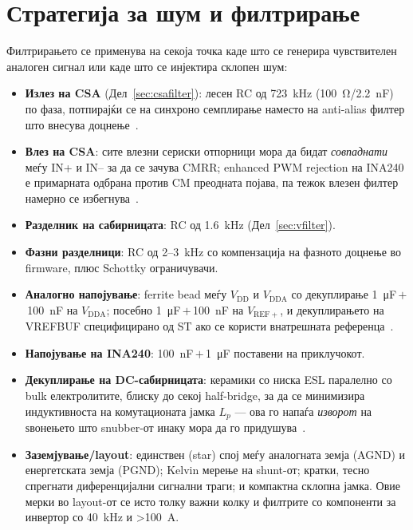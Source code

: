 \documentclass[journal,onecolumn,11pt]{IEEEtran}
\begin{document}
\section{Стратегија за шум и филтрирање}\label{sec:noise}
Филтрирањето се применува на секоја точка каде што се генерира чувствителен аналоген
сигнал или каде што се инјектира склопен шум:
\begin{itemize}[leftmargin=1.3em]
\item \textbf{Излез на CSA} (Дел~\ref{sec:csafilter}): лесен RC од \SI{723}{\kilo\hertz}
      (\SI{100}{\ohm}/\SI{2.2}{\nano\farad}) по фаза, потпирајќи се на синхроно
      семплирање наместо на anti-alias филтер што внесува доцнење~\cite{an5346}.
\item \textbf{Влез на CSA}: сите влезни сериски отпорници мора да бидат \emph{совпаднати}
      меѓу IN+ и IN-- за да се зачува CMRR; enhanced PWM rejection на INA240 е
      примарната одбрана против CM преодната појава, па тежок влезен филтер намерно се
      избегнува~\cite{ina240ds}.
\item \textbf{Разделник на сабирницата}: RC од \SI{1.6}{\kilo\hertz} (Дел~\ref{sec:vfilter}).
\item \textbf{Фазни разделници}: RC од 2--\SI{3}{\kilo\hertz} со компензација на
      фазното доцнење во firmware, плюс Schottky ограничувачи.
\item \textbf{Аналогно напојување}: ferrite bead меѓу $V_{\mathrm{DD}}$ и
      $V_{\mathrm{DDA}}$ со декуплирање \SI{1}{\micro\farad}\,$+$\,\SI{100}{\nano\farad}
      на $V_{\mathrm{DDA}}$; посебно \SI{1}{\micro\farad}\,$+$\,\SI{100}{\nano\farad} на
      $V_{\mathrm{REF+}}$, и декуплирањето на VREFBUF специфицирано од ST ако се
      користи внатрешната референца~\cite{stm32g473ds}.
\item \textbf{Напојување на INA240}: \SI{100}{\nano\farad}\,$+$\,\SI{1}{\micro\farad}
      поставени на приклучокот.
\item \textbf{Декуплирање на DC-сабирницата}: керамики со ниска ESL паралелно со bulk
      електролитите, блиску до секој half-bridge, за да се минимизира индуктивноста на
      комутационата јамка $L_p$ --- ова го напаѓа \emph{изворот} на ѕвонењето што
      snubber-от инаку мора да го придушува~\cite{severns}.
\item \textbf{Заземјување/layout}: единствен (star) спој меѓу аналогната земја (AGND)
      и енергетската земја (PGND); Kelvin мерење на shunt-от; кратки, тесно спрегнати
      диференцијални сигнални траги; и компактна склопна јамка. Овие мерки во layout-от
      се исто толку важни колку и филтрите со компоненти за инвертор со
      \SI{40}{\kilo\hertz} и \SI{>100}{\ampere}.
\end{itemize}
\end{document}
